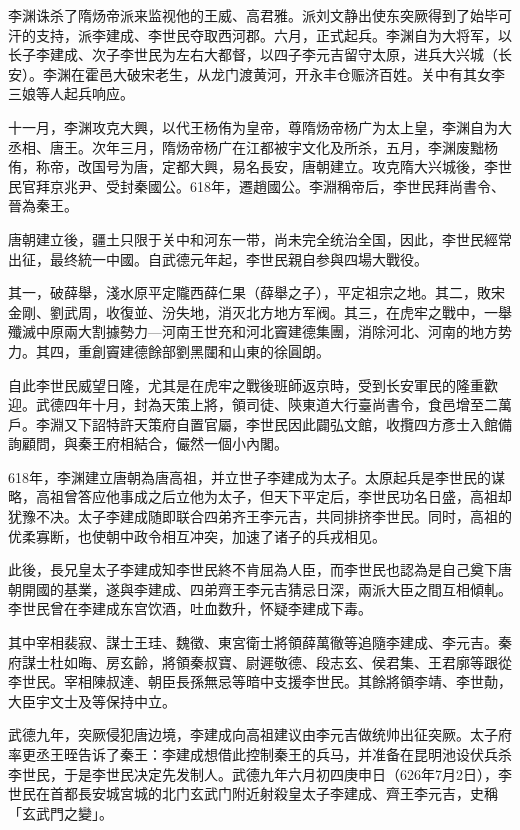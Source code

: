 李渊诛杀了隋炀帝派来监视他的王威、高君雅。派刘文静出使东突厥得到了始毕可汗的支持，派李建成、李世民夺取西河郡。六月，正式起兵。李渊自为大将军，以长子李建成、次子李世民为左右大都督，以四子李元吉留守太原，进兵大兴城（长安）。李渊在霍邑大破宋老生，从龙门渡黄河，开永丰仓赈济百姓。关中有其女李三娘等人起兵响应。

十一月，李渊攻克大興，以代王杨侑为皇帝，尊隋炀帝杨广为太上皇，李渊自为大丞相、唐王。次年三月，隋炀帝杨广在江都被宇文化及所杀，五月，李渊废黜杨侑，称帝，改国号为唐，定都大興，易名長安，唐朝建立。攻克隋大兴城後，李世民官拜京兆尹、受封秦國公。618年，遷趙國公。李淵稱帝后，李世民拜尚書令、晉為秦王。

唐朝建立後，疆土只限于关中和河东一带，尚未完全统治全国，因此，李世民經常出征，最终統一中國。自武德元年起，李世民親自参與四場大戰役。

其一，破薛舉，淺水原平定隴西薛仁果（薛舉之子），平定祖宗之地。其二，敗宋金剛、劉武周，收復並、汾失地，消灭北方地方军阀。其三，在虎牢之戰中，一舉殲滅中原兩大割據勢力—河南王世充和河北竇建德集團，消除河北、河南的地方势力。其四，重創竇建德餘部劉黑闥和山東的徐圓朗。

自此李世民威望日隆，尤其是在虎牢之戰後班師返京時，受到长安軍民的隆重歡迎。武德四年十月，封為天策上將，領司徒、陝東道大行臺尚書令，食邑增至二萬戶。李淵又下詔特許天策府自置官屬，李世民因此闢弘文館，收攬四方彥士入館備詢顧問，與秦王府相結合，儼然一個小內閣。

618年，李渊建立唐朝為唐高祖，并立世子李建成为太子。太原起兵是李世民的谋略，高祖曾答应他事成之后立他为太子，但天下平定后，李世民功名日盛，高祖却犹豫不决。太子李建成随即联合四弟齐王李元吉，共同排挤李世民。同时，高祖的优柔寡断，也使朝中政令相互冲突，加速了诸子的兵戎相见。

此後，長兄皇太子李建成知李世民終不肯屈為人臣，而李世民也認為是自己奠下唐朝開國的基業，遂與李建成、四弟齊王李元吉猜忌日深，兩派大臣之間互相傾軋。李世民曾在李建成东宫饮酒，吐血数升，怀疑李建成下毒。

其中宰相裴寂、謀士王珪、魏徵、東宮衛士將領薛萬徹等追隨李建成、李元吉。秦府謀士杜如晦、房玄齡，將領秦叔寶、尉遲敬德、段志玄、侯君集、王君廓等跟從李世民。宰相陳叔達、朝臣長孫無忌等暗中支援李世民。其餘將領李靖、李世勣，大臣宇文士及等保持中立。

武德九年，突厥侵犯唐边境，李建成向高祖建议由李元吉做统帅出征突厥。太子府率更丞王晊告诉了秦王：李建成想借此控制秦王的兵马，并准备在昆明池设伏兵杀李世民，于是李世民决定先发制人。武德九年六月初四庚申日（626年7月2日），李世民在首都長安城宮城的北门玄武门附近射殺皇太子李建成、齊王李元吉，史稱「玄武門之變」。

